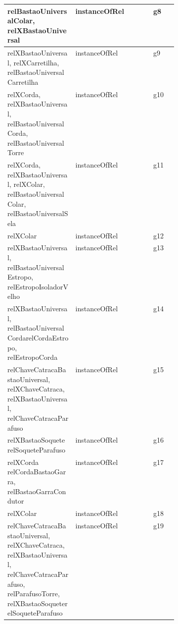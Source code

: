 \begin{center}
\begin{longtable}[H]{|p{0.4\linewidth}|l|l|}
relBastaoUniversalColar, relXBastaoUniversal                                                                                 						& instanceOfRel              		 & g8         \\ \hline
relXBastaoUniversal, relXCarretilha, relBastaoUniversalCarretilha                                                             						& instanceOfRel              		 & g9         \\ \hline
relXCorda, relXBastaoUniversal, relBastaoUniversalCorda, relBastaoUniversalTorre                                               						& instanceOfRel              		 & g10        \\ \hline
relXCorda, relXBastaoUniversal, relXColar, relBastaoUniversalColar, relBastaoUniversalSela                                      					& instanceOfRel              		 & g11        \\ \hline
relXColar                                                                                                                   						& instanceOfRel              		 & g12        \\ \hline
relXBastaoUniversal, relBastaoUniversalEstropo, relEstropoIsoladorVelho                                                       						& instanceOfRel              		 & g13        \\ \hline
relXBastaoUniversal, relBastaoUniversalCordarelCordaEstropo, relEstropoCorda                                                  						& instanceOfRel              		 & g14        \\ \hline
relChaveCatracaBastaoUniversal, relXChaveCatraca, relXBastaoUniversal, relChaveCatracaParafuso                                 						& instanceOfRel              		 & g15        \\ \hline
relXBastaoSoquete relSoqueteParafuso                                                                                        						& instanceOfRel              		 & g16        \\ \hline
relXCorda relCordaBastaoGarra, relBastaoGarraCondutor                                                                        						& instanceOfRel              		 & g17        \\ \hline
relXColar                                                                                                       									& instanceOfRel              		 & g18        \\ \hline
relChaveCatracaBastaoUniversal, relXChaveCatraca, relXBastaoUniversal, relChaveCatracaParafuso, relParafusoTorre, relXBastaoSoqueterelSoqueteParafuso    & instanceOfRel              		 & g19        \\ \hline

\end{longtable}
\end{center}
